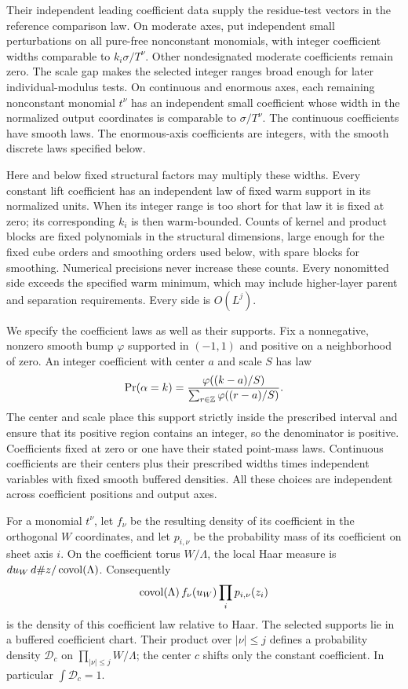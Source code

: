 \begin{enumerate}
Their independent leading coefficient data supply the
residue-test vectors in the reference comparison law.  On moderate
axes, put independent small perturbations on all pure-free
nonconstant monomials, with integer coefficient widths comparable to
$k_i\sigma/T^\nu$.  Other nondesignated moderate coefficients remain
zero. The scale gap makes the selected integer ranges broad
enough for later individual-modulus tests. On continuous and
enormous axes, each remaining nonconstant
monomial $t^\nu$ has an independent small coefficient whose width
in the normalized output coordinates is comparable to
$\sigma/T^\nu$. The continuous coefficients have smooth laws.
The enormous-axis coefficients are integers, with the smooth
discrete laws specified below.
\end{enumerate}
Here and below fixed structural factors may multiply these widths.
Every constant lift coefficient has an independent law of fixed
warm support in its normalized units. When its integer range is
too short for that law it is fixed at zero; its corresponding
$k_i$ is then warm-bounded. Counts of kernel and product blocks
are fixed polynomials in the structural dimensions, large enough
for the fixed cube orders and smoothing orders used below, with
spare blocks for smoothing. Numerical precisions never increase
these counts. Every nonomitted side exceeds the specified warm
minimum, which may include higher-layer parent and separation
requirements. Every side is $O(L^j)$.

We specify the coefficient laws as well as their supports.
Fix a nonnegative, nonzero smooth bump $\varphi$ supported in
$(-1,1)$ and positive on a neighborhood of zero.
An integer coefficient with center $a$ and scale $S$ has law
\[
 \Pr(\alpha=k)=
 \frac{\varphi((k-a)/S)}
      {\sum_{r\in\mathbb Z}\varphi((r-a)/S)}.
\]
The center and scale place this support strictly inside the
prescribed interval and ensure that its positive region contains
an integer, so the denominator is positive. Coefficients fixed at zero or one have their
stated point-mass laws. Continuous coefficients are their centers
plus their prescribed widths times independent variables with
fixed smooth buffered densities. All these choices are independent
across coefficient positions and output axes.

For a monomial $t^\nu$, let $f_\nu$ be the resulting density of its
coefficient in the orthogonal $W$ coordinates, and let
$p_{i,\nu}$ be the probability mass of its coefficient on sheet
axis $i$. On the coefficient torus $W/\Lambda$, the local Haar
measure is $du_W\,d\#z/\operatorname{covol}(\Lambda)$. Consequently
\[
 \operatorname{covol}(\Lambda)\,f_\nu(u_W)\prod_i p_{i,\nu}(z_i)
\]
is the density of this coefficient law relative to Haar.
The selected supports lie in a buffered coefficient chart.
Their product over $|\nu|\le j$ defines a probability density
$\mathcal D_c$ on
$\prod_{|\nu|\le j}W/\Lambda$; the center $c$ shifts only the
constant coefficient. In particular $\int\mathcal D_c=1$.

